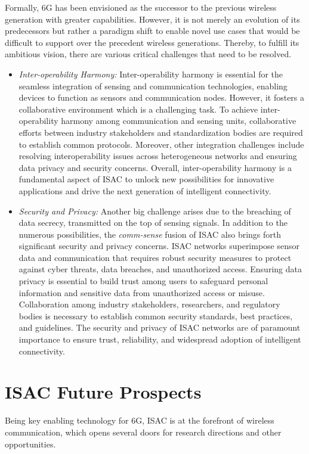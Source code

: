 \documentclass[journal, comsoc]{IEEEtran}
\begin{document}
Formally, 6G has been envisioned as the successor to the previous wireless generation with greater capabilities. However, it is not merely an evolution of its predecessors but rather a paradigm shift to enable novel use cases that would be difficult to support over the precedent wireless generations. Thereby, to fulfill its ambitious vision, there are various critical challenges that need to be resolved.

\begin{itemize}
    \item \textit{Inter-operability Harmony:} Inter-operability harmony is essential for the seamless integration of sensing and communication technologies, enabling devices to function as sensors and communication nodes. However, it fosters a collaborative environment which is a challenging task. To achieve inter-operability harmony among communication and sensing units, collaborative efforts between industry stakeholders and standardization bodies are required to establish common protocols. Moreover, other integration challenges include resolving interoperability issues across heterogeneous networks and ensuring data privacy and security concerns. Overall, inter-operability harmony is a fundamental aspect of ISAC to unlock new possibilities for innovative applications and drive the next generation of intelligent connectivity.

\item \textit{Security and Privacy:} Another big challenge arises due to the breaching of data secrecy, transmitted on the top of sensing signals. In addition to the numerous possibilities, the \emph{comm-sense} fusion of ISAC also brings forth significant security and privacy concerns. ISAC networks superimpose sensor data and communication that requires robust security measures to protect against cyber threats, data breaches, and unauthorized access. Ensuring data privacy is essential to build trust among users to safeguard personal information and sensitive data from unauthorized access or misuse. Collaboration among industry stakeholders, researchers, and regulatory bodies is necessary to establish common security standards, best practices, and guidelines. The security and privacy of ISAC networks are of paramount importance to ensure trust, reliability, and widespread adoption of intelligent connectivity.\cite{sec}
\end{itemize}

\section{ISAC Future Prospects}
\label{sec:5}
Being key enabling technology for 6G, ISAC is at the forefront of wireless communication, which opens several doors for research directions and other opportunities. 
\end{document}
